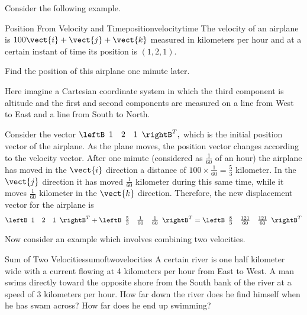 Consider the following example. 

\begin{example}{Position From Velocity and Time}{positionvelocitytime}
The velocity of an airplane is $100\vect{i}+\vect{j}+\vect{k}$
measured in kilometers per hour and at a certain instant of time its
position is $\left( 1,2,1\right) .$ 

Find the position of this airplane one minute later.
\end{example}

\begin{solution}
Here imagine a Cartesian coordinate
system in which the third component is altitude and the first and second
components are measured on a line from West to East and a line from South to
North. 

Consider the vector $
\leftB
\begin{array}{rrr}
1 & 2 & 1
\end{array}
\rightB^T ,$ which is the initial position vector
of the airplane. As the plane moves, the position vector changes according to the velocity vector. 
After one minute (considered as $\frac{1}{60}$ of an hour)
the airplane has moved in the $\vect{i}$ direction a distance of 
$100\times \frac{1}{60}= \frac{5}{3}$ kilometer. In the $\vect{j}
$ direction it has moved $\frac{1}{60}$ kilometer during this same time,
while it moves $\frac{1}{60}$ kilometer in the $\vect{k}$ direction.
Therefore, the new displacement vector for the airplane is
\begin{equation*}
\leftB 
\begin{array}{rrr}
1 & 2 & 1
\end{array}
\rightB^T +
\leftB 
\begin{array}{rrr}
\frac{5}{3} & \frac{1}{60} & \frac{1}{60}
\end{array}
\rightB^T
=\leftB 
\begin{array}{rrr}
\frac{8}{3} & \frac{121}{60} & \frac{121}{60}
\end{array}
\rightB^T
\end{equation*}
\end{solution}

Now consider an example which involves combining two velocities.

\begin{example}{Sum of Two Velocities}{sumoftwovelocities}
A certain river is one half kilometer wide with a current flowing at 4 kilometers per
hour from East to West. A man swims directly toward the opposite shore from
the South bank of the river at a speed of 3 kilometers per hour. How far down the
river does he find himself when he has swam across? How far does he end up
swimming?
\end{example}

